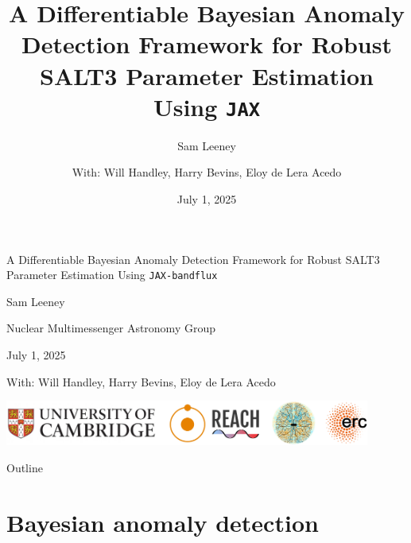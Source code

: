 \documentclass[aspectratio=169]{beamer}
\title{A Differentiable Bayesian Anomaly Detection Framework for Robust SALT3 Parameter Estimation Using \texttt{JAX}}
\subtitle{Sam Leeney}
\date{July 1, 2025}
\author{With: Will Handley, Harry Bevins, Eloy de Lera Acedo}
\institute{Nuclear Multimessenger Astronomy Group, Utrecht}
\begin{document}
\begin{frame}
  \begin{center}
    {\Large A Differentiable Bayesian Anomaly Detection Framework for Robust SALT3 Parameter Estimation Using \texttt{JAX-bandflux}\par}
    \vspace{0.3cm}

    {\normalsize Sam Leeney\par}
    \vspace{0.3cm}

    {\small Nuclear Multimessenger Astronomy Group\par}
    {\small July 1, 2025\par}
    \vspace{0.5cm}

    {\scriptsize With: Will Handley, Harry Bevins, Eloy de Lera Acedo\par}
    \vfill

    \includegraphics[width=0.9\textwidth]{images/affiliations.png}
  \end{center}
\end{frame}

\begin{frame}{Outline}
  \tableofcontents[hideallsubsections]
\end{frame}


\section{Bayesian anomaly detection}
\end{document}
